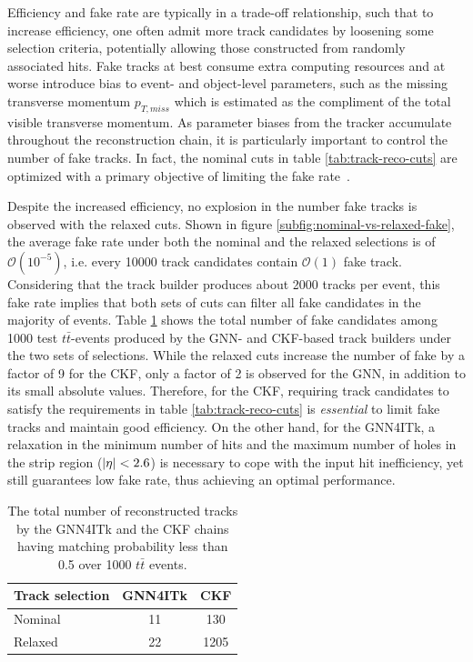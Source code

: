 Efficiency and fake rate are typically in a trade-off relationship, such that to increase efficiency, one often admit more track candidates by loosening some selection criteria, potentially allowing those constructed from randomly associated hits. 
Fake tracks at best consume extra computing resources and at worse introduce bias to event- and object-level parameters, such as the missing transverse momentum $p_{T,miss}$ which is estimated as the compliment of the total visible transverse momentum. 
As parameter biases from the tracker accumulate throughout the reconstruction chain, it is particularly important to control the number of fake tracks.
In fact, the nominal cuts in table \ref{tab:track-reco-cuts} are optimized with a primary objective of limiting the fake rate~\cite{Aad_2025}.

Despite the increased efficiency, no explosion in the number fake tracks is observed with the relaxed cuts. 
Shown in figure \ref{subfig:nominal-vs-relaxed-fake}, the average fake rate under both the nominal and the relaxed selections is of $\mathcal{O}(10^{-5})$, i.e. every 10000 track candidates contain $\mathcal{O}(1)$ fake track.
Considering that the track builder produces about 2000 tracks per event, this fake rate implies that both sets of cuts can filter all fake candidates in the majority of events.
Table \ref{tab:integrated-fake} shows the total number of fake candidates among 1000 test $t\bar{t}$-events produced by the GNN- and CKF-based track builders under the two sets of selections. 
While the relaxed cuts increase the number of fake by a factor of 9 for the CKF, only a factor of 2 is observed for the GNN, in addition to its small absolute values.
Therefore, for the CKF, requiring track candidates to satisfy the requirements in table \ref{tab:track-reco-cuts} is \textit{essential} to limit fake tracks and maintain good efficiency. 
On the other hand, for the GNN4ITk, a relaxation in the minimum number of hits and the maximum number of holes in the strip region ($\abs{\eta}<2.6$) is necessary to cope with the input hit inefficiency, yet still guarantees low fake rate, thus achieving an optimal performance.

\begin{table}[h]
    \centering
    \begin{tabular}{|l|c|c|} \hline
        Track selection & GNN4ITk & CKF \\ \hline
        Nominal & 11 & 130 \\
        Relaxed & 22 & 1205 \\ \hline
    \end{tabular}
    \caption{The total number of reconstructed tracks by the GNN4ITk and the CKF chains having matching probability less than 0.5 over 1000 $t\bar{t}$ events.}
    \label{tab:integrated-fake}
\end{table}

